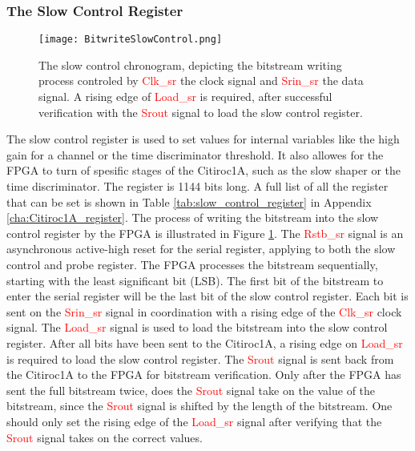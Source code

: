 \subsubsection{The Slow Control Register}

\begin{figure}
    \centering
    \texttt{[image: BitwriteSlowControl.png]}
    \caption{The slow control chronogram, depicting the bitstream writing process controled by  \textcolor{red}{Clk\_sr} the clock signal and  \textcolor{red}{Srin\_sr} the data signal. A rising edge of \textcolor{red}{Load\_sr} is required,
     after successful verification with the \textcolor{red}{Srout} signal to load the slow control register.\autocite{datasheetCITIROC}}
    \label{fig:CITIROC1A_writing_bitstream}
\end{figure}
The slow control register is used to set values for internal variables like the high gain for a channel or the time discriminator threshold.
It also allowes for the FPGA to turn of spesific stages of the Citiroc1A, such as the slow shaper or the time discriminator.
The register is 1144 bits long. A full list of all the register that can be set is shown in Table \ref{tab:slow_control_register} in Appendix \ref{cha:Citiroc1A_register}.
\newline
The process of writing the bitstream into the slow control register by the FPGA is illustrated in Figure \ref{fig:CITIROC1A_writing_bitstream}.
\newline
The \textcolor{red}{Rstb\_sr} signal is an asynchronous active-high reset for the serial register, applying to both the slow control and probe register. 
\newline
The FPGA processes the bitstream sequentially, starting with the least significant bit (LSB).
The first bit of the bitstream to enter the serial register will be the last bit of the slow control register.
Each bit is sent on the \textcolor{red}{Srin\_sr} signal in coordination with a rising edge of the \textcolor{red}{Clk\_sr} clock signal.
\newline
The \textcolor{red}{Load\_sr} signal is used to load the bitstream into the slow control register. After all bits have been sent to the Citiroc1A,
a rising edge on \textcolor{red}{Load\_sr} is required to load the slow control register.
\newline
The \textcolor{red}{Srout} signal is sent back from the Citiroc1A to the FPGA for bitstream verification.
Only after the FPGA has sent the full bitstream twice, does the \textcolor{red}{Srout} signal take on the value of the bitstream, since the \textcolor{red}{Srout} signal is shifted by the length of the bitstream.\autocite{datasheetCITIROC}
One should only set the rising edge of the \textcolor{red}{Load\_sr} signal after verifying that the \textcolor{red}{Srout} signal takes on the correct values.

